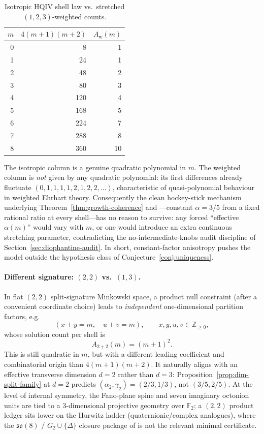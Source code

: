 \documentclass[11pt]{amsart}
\begin{document}
\begin{table}[ht]
\centering
\caption{Isotropic HQIV shell law vs.\ stretched \((1,2,3)\)-weighted counts.}
\label{tab:stretch}
\begin{tabular}{r|rr}
\(m\) & \(4(m+1)(m+2)\) & \(A_{\mathrm{w}}(m)\)\\\hline
0 & 8 & 1\\
1 & 24 & 1\\
2 & 48 & 2\\
3 & 80 & 3\\
4 & 120 & 4\\
5 & 168 & 5\\
6 & 224 & 7\\
7 & 288 & 8\\
8 & 360 & 10
\end{tabular}
\end{table}

The isotropic column is a genuine quadratic polynomial in \(m\). The weighted column is \emph{not} given by any quadratic polynomial: its first differences already fluctuate \((0,1,1,1,1,2,1,2,2,\dots)\), characteristic of quasi-polynomial behaviour in weighted Ehrhart theory. Consequently the clean hockey-stick mechanism underlying Theorem~\ref{thm:growth-coherence} and ---constant \(\alpha=3/5\) from a fixed rational ratio at every shell---has no reason to survive: any forced ``effective \(\alpha(m)\)'' would vary with \(m\), or one would introduce an extra continuous stretching parameter, contradicting the no-intermediate-knobs audit discipline of Section~\ref{sec:diophantine-audit}. In short, constant-factor anisotropy pushes the model outside the hypothesis class of Conjecture~\ref{conj:uniqueness}.

\paragraph{Different signature: \((2,2)\) vs.\ \((1,3)\).}
In flat \((2,2)\) split-signature Minkowski space, a product null constraint (after a convenient coordinate choice) leads to \emph{independent} one-dimensional partition factors, e.g.
\[
(x+y=m,\quad u+v=m),\qquad x,y,u,v\in\mathbb{Z}_{\ge 0},
\]
whose solution count per shell is
\[
A_{2+2}(m)=(m+1)^2.
\]
This is still quadratic in \(m\), but with a different leading coefficient and combinatorial origin than \(4(m+1)(m+2)\). It naturally aligns with an effective transverse dimension \(d=2\) rather than \(d=3\): Proposition~\ref{prop:dim-split-family} at \(d=2\) predicts \((\alpha_2,\gamma_2)=(2/3,1/3)\), not \((3/5,2/5)\). At the level of internal symmetry, the Fano-plane spine and seven imaginary octonion units are tied to a \(3\)-dimensional projective geometry over \(\mathbb{F}_2\); a \((2,2)\) product ledger sits lower on the Hurwitz ladder (quaternionic/complex analogues), where the \(\mathfrak{so}(8)\) / \(G_2\cup\{\Delta\}\) closure package of \cite{hqiv-so8-paper} is not the relevant minimal certificate.
\end{document}
